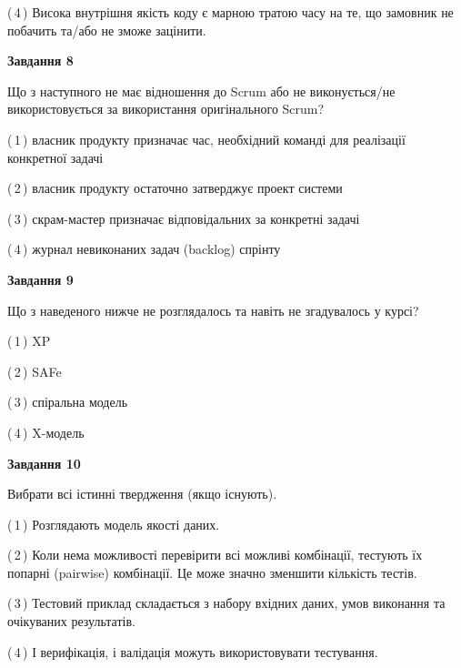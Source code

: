 \documentclass[10pt, ukrainian]{article}
\begin{document}
{\begin {large}
(\,4\,) Висока внутрішня якість коду є марною тратою часу на те, що замовник не побачить та/або не зможе зацінити. %


{\begin {center}\textbf{Завдання 8}\end {center}}\par
Що з наступного не має відношення до Scrum або не виконується/не використовується за використання оригінального Scrum?\par
\vspace{2mm}



(\,1\,) власник продукту призначає час, необхідний команді для реалізації конкретної задачі%



(\,2\,) власник продукту остаточно затверджує проект системи%



(\,3\,) скрам-мастер призначає відповідальних за конкретні задачі%



(\,4\,) журнал невиконаних задач (backlog) спрінту%


{\begin {center}\textbf{Завдання 9}\end {center}}\par
Що з наведеного нижче не розглядалось та навіть не згадувалось у курсі?\par
\vspace{2mm}



(\,1\,) XP%



(\,2\,) SAFe%



(\,3\,) спіральна модель%



(\,4\,) X-модель%


{\begin {center}\textbf{Завдання 10}\end {center}}\par
Вибрати всі істинні твердження (якщо існують).\par
\vspace{2mm}



(\,1\,) Розглядають модель якості даних.%



(\,2\,) Коли нема можливості перевірити всі можливі комбінації, тестують їх попарні (pairwise) комбінації. Це може значно зменшити кількість тестів.%



(\,3\,) Тестовий приклад складається з набору вхідних даних, умов виконання та очікуваних результатів.%



(\,4\,) І верифікація, і валідація можуть використовувати тестування.%



\end {large}}
\end{document}
